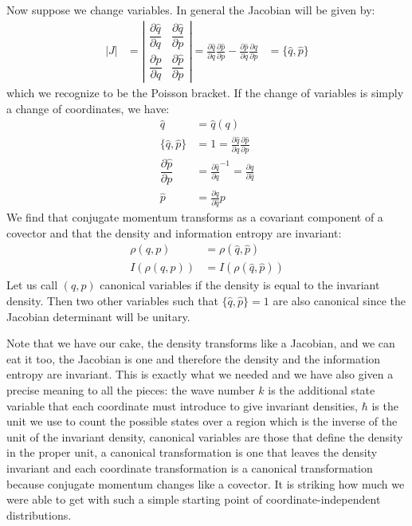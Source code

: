 \documentclass[11pt]{elsarticle}
\begin{document}
Now suppose we change variables. In general the Jacobian will be given by:
\begin{equation}
\label{Poisson}
\begin{aligned}
|J| &= \left| \begin{matrix}
\dfrac{\partial \hat{q}}{\partial q} & \dfrac{\partial \hat{q}}{\partial p} \\[2.2ex]
\dfrac{\partial \hat{p}}{\partial q} & \dfrac{\partial \hat{p}}{\partial p} \end{matrix} \right| = \frac{\partial \hat{q}}{\partial q} \frac{\partial \hat{p}}{\partial p} - \frac{\partial \hat{p}}{\partial q} \frac{\partial \hat{q}}{\partial p} &= \{\hat{q}, \hat{p}\}
\end{aligned}
\end{equation}
which we recognize to be the Poisson bracket. If the change of variables is simply a change of coordinates, we have:
\begin{equation}
\label{coordinate_change}
\begin{aligned}
\hat{q} &= \hat{q}(q) \\
\{\hat{q}, \hat{p}\} &= 1 = \frac{\partial \hat{q}}{\partial q} \frac{\partial \hat{p}}{\partial p} \\
\dfrac{\partial \hat{p}}{\partial p} &= \frac{\partial \hat{q}}{\partial q} ^{-1} = \frac{\partial q}{\partial \hat{q}} \\
\hat{p} &= \frac{\partial q}{\partial \hat{q}} p
\end{aligned}
\end{equation}
We find that conjugate momentum transforms as a covariant component of a covector and that the density and information entropy are invariant:
\begin{equation}
\label{density_invariance}
\begin{aligned}
\rho(q,p) &= \rho(\hat{q}, \hat{p}) \\
I(\rho(q,p)) &= I(\rho(\hat{q},\hat{p}))
\end{aligned}
\end{equation}
Let us call $(q,p)$ canonical variables if the density is equal to the invariant density. Then two other variables such that $\{\hat{q}, \hat{p}\}=1$ are also canonical since the Jacobian determinant will be unitary.

Note that we have our cake, the density transforms like a Jacobian, and we can eat it too, the Jacobian is one and therefore the density and the information entropy are invariant. This is exactly what we needed and we have also given a precise meaning to all the pieces: the wave number $k$ is the additional state variable that each coordinate must introduce to give invariant densities, $\hbar$ is the unit we use to count the possible states over a region which is the inverse of the unit of the invariant density, canonical variables are those that define the density in the proper unit, a canonical transformation is one that leaves the density invariant and each coordinate transformation is a canonical transformation because conjugate momentum changes like a covector. It is striking how much we were able to get with such a simple starting point of coordinate-independent distributions.
\end{document}
